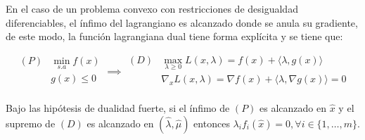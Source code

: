 En el caso de un problema convexo con restricciones de desigualdad diferenciables, el ínfimo del lagrangiano es alcanzado donde se anula su gradiente, de este modo, la función lagrangiana dual tiene forma explícita y se tiene que:

\begin{equation*}
	\begin{aligned}
		(P) & \min_{s.a} f(x)\\
		& g(x) \leq 0\\
	\end{aligned} \implies
	\begin{aligned}
		(D) & \max_{\lambda\geq 0} L(x,\lambda)= f(x) + \langle\lambda,g(x)\rangle\\
		& \nabla_x L(x,\lambda) = \nabla f(x) + \langle\lambda,\nabla g(x)\rangle = 0\\
	\end{aligned}
\end{equation*}


\begin{theorem}
	Bajo las hipótesis de dualidad fuerte, si el ínfimo de $(P)$ es alcanzado en $\hat{x}$ y el supremo de $(D)$ es alcanzado en $(\hat{\lambda},\hat{\mu})$ entonces $\lambda_i f_i(\hat{x})=0, \forall i\in\{1,\ldots,m\}$.
\end{theorem}
